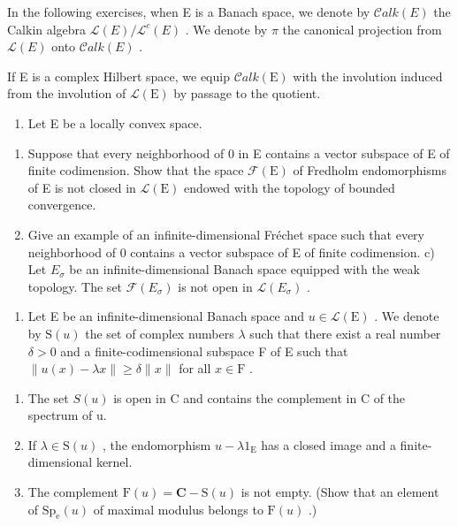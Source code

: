 \exercisesection{}

In the following exercises, when E is a Banach space, we denote by \(\mathcal{C}alk(E)\) the Calkin algebra \(\mathcal{L}(E)/\mathcal{L}^{c}(E)\) . We denote by \(\pi\) the canonical projection from \(\mathcal{L}(E)\) onto \(\mathcal{C}alk(E)\) .

If E is a complex Hilbert space, we equip \(\mathcal{C}alk(\mathrm{E})\) with the involution induced from the involution of \(\mathcal{L}(\mathrm{E})\) by passage to the quotient.

\begin{enumerate}
\def\labelenumi{\arabic{enumi})}
\tightlist
\item
  Let E be a locally convex space.
\end{enumerate}

\begin{enumerate}
\def\labelenumi{\alph{enumi})}
\item
  Suppose that every neighborhood of 0 in E contains a vector subspace of E of finite codimension. Show that the space \(\mathcal{F}(\mathrm{E})\) of Fredholm endomorphisms of E is not closed in \(\mathcal{L}(\mathrm{E})\) endowed with the topology of bounded convergence.
\item
  Give an example of an infinite-dimensional Fréchet space such that every neighborhood of 0 contains a vector subspace of E of finite codimension. c) Let \(E_{\sigma}\) be an infinite-dimensional Banach space equipped with the weak topology. The set \(\mathcal{F}(E_{\sigma})\) is not open in \(\mathcal{L}(E_{\sigma})\) .
\end{enumerate}

\begin{enumerate}
\def\labelenumi{\arabic{enumi})}
\setcounter{enumi}{1}
\tightlist
\item
  Let E be an infinite-dimensional Banach space and \(u \in \mathcal{L}(\mathrm{E})\) . We denote by \(\mathrm{S}(u)\) the set of complex numbers \(\lambda\) such that there exist a real number \(\delta > 0\) and a finite-codimensional subspace F of E such that \(\| u(x) - \lambda x \| \geqslant \delta \| x \|\) for all \(x \in \mathrm{F}\) .
\end{enumerate}

\begin{enumerate}
\def\labelenumi{\alph{enumi})}
\item
  The set \(S(u)\) is open in C and contains the complement in C of the spectrum of u.
\item
  If \(\lambda \in \mathrm{S}(u)\) , the endomorphism \(u - \lambda 1_{\mathrm{E}}\) has a closed image and a finite-dimensional kernel.
\item
  The complement \(\mathrm{F}(u) = \mathbf{C} - \mathrm{S}(u)\) is not empty. (Show that an element of \(\mathrm{Sp}_{\mathrm{e}}(u)\) of maximal modulus belongs to \(\mathrm{F}(u)\) .)
\end{enumerate}

